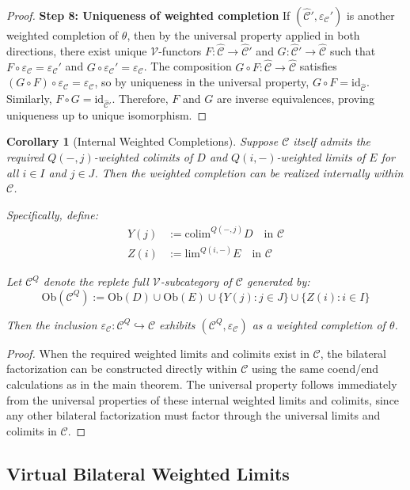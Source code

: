 \documentclass[11pt]{article}
\theoremstyle{plain}
\newtheorem{corollary}[theorem]{Corollary}
\theoremstyle{definition}
\theoremstyle{remark}
\newcommand{\V}{\mathcal{V}}
\newcommand{\C}{\mathcal{C}}
\newcommand{\id}{\mathrm{id}}
\newcommand{\colim}{\mathrm{colim}}
\renewcommand{\lim}{\mathrm{lim}}
\newcommand{\wh}[1]{\widehat{#1}}
\begin{document}
\begin{proof}
\textbf{Step 8: Uniqueness of weighted completion}
If $(\wh{\C}', \varepsilon_\C')$ is another weighted completion of $\theta$, then by the universal property applied in both directions, there exist unique $\V$-functors $F : \wh{\C} \to \wh{\C}'$ and $G : \wh{\C}' \to \wh{\C}$ such that $F \circ \varepsilon_\C = \varepsilon_\C'$ and $G \circ \varepsilon_\C' = \varepsilon_\C$. The composition $G \circ F : \wh{\C} \to \wh{\C}$ satisfies $(G \circ F) \circ \varepsilon_\C = \varepsilon_\C$, so by uniqueness in the universal property, $G \circ F = \id_{\wh{\C}}$. Similarly, $F \circ G = \id_{\wh{\C}'}$. Therefore, $F$ and $G$ are inverse equivalences, proving uniqueness up to unique isomorphism.
\end{proof}

\begin{corollary}[Internal Weighted Completions]\label{cor:internal-weighted completion}
Suppose $\C$ itself admits the required $Q(-, j)$-weighted colimits of $D$ and $Q(i, -)$-weighted limits of $E$ for all $i \in I$ and $j \in J$. Then the weighted completion can be realized internally within $\C$.

Specifically, define:
\begin{align}
Y(j) &:= \colim^{Q(-, j)} D \quad \text{in } \C \\
Z(i) &:= \lim^{Q(i, -)} E \quad \text{in } \C
\end{align}

Let $\C^Q$ denote the replete full $\V$-subcategory of $\C$ generated by:
$$\mathrm{Ob}(\C^Q) := \mathrm{Ob}(D) \cup \mathrm{Ob}(E) \cup \{Y(j) : j \in J\} \cup \{Z(i) : i \in I\}$$

Then the inclusion $\varepsilon_\C : \C^Q \hookrightarrow \C$ exhibits $(\C^Q, \varepsilon_\C)$ as a weighted completion of $\theta$.
\end{corollary}

\begin{proof}
When the required weighted limits and colimits exist in $\C$, the bilateral factorization can be constructed directly within $\C$ using the same coend/end calculations as in the main theorem. The universal property follows immediately from the universal properties of these internal weighted limits and colimits, since any other bilateral factorization must factor through the universal limits and colimits in $\C$.
\end{proof}

\subsection{Virtual Bilateral Weighted Limits}
\end{document}
